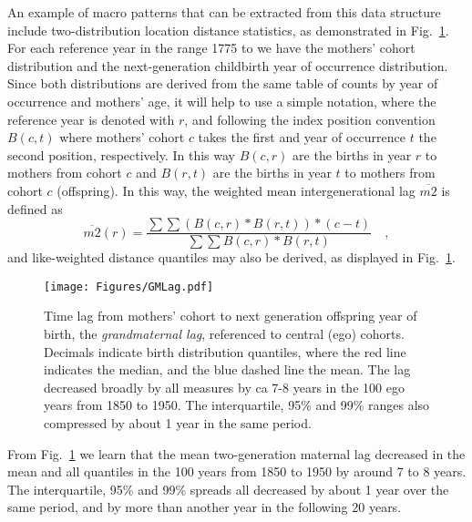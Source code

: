 An example of macro patterns that can be extracted from this data structure include two-distribution location distance statistics, as demonstrated in Fig.~\ref{fig:gmlag}. For each reference year in the range 1775 to  we have the mothers' cohort distribution and the next-generation childbirth year of occurrence distribution. Since both distributions are derived from the same table of counts by year of occurrence and mothers' age, it will help to use a simple notation, where the reference year is denoted with $r$, and following the index position convention $B(c,t)$ where mothers' cohort $c$ takes the first and year of occurrence $t$ the second position, respectively. In this way $B(c,r)$ are the births in year $r$ to mothers from cohort $c$ and $B(r,t)$ are the births in year $t$ to mothers from cohort $c$ (offspring). In this way, the weighted mean intergenerational lag $\overline{m2}$ is defined as
\begin{equation}
\overline{m2}(r) = \frac{\sum\sum (B(c,r)*B(r,t)) * (c - t)}{\sum\sum B(c,r)*B(r,t)} \quad \mathrm{,}
\end{equation}
and like-weighted distance quantiles may also be derived, as displayed in Fig.~\ref{fig:gmlag}.

\begin{figure}
\texttt{[image: Figures/GMLag.pdf]}
\caption{Time lag from mothers' cohort to next generation offspring year of birth, the \emph{grandmaternal lag}, referenced to central (ego) cohorts. Decimals indicate birth distribution quantiles, where the red line indicates the median, and the blue dashed line the mean. The lag decreased broadly by all measures by ca 7-8 years in the 100 ego years from 1850 to 1950. The interquartile, 95\% and 99\% ranges also compressed by about 1 year in the same period.}
\label{fig:gmlag}
\end{figure}

From Fig.~\ref{fig:gmlag} we learn that the mean two-generation maternal lag decreased in the mean and all quantiles in the 100 years from 1850 to 1950 by around 7 to 8 years. The interquartile, 95\% and 99\% spreads all decreased by about 1 year over the same period, and by more than another year in the following 20 years.